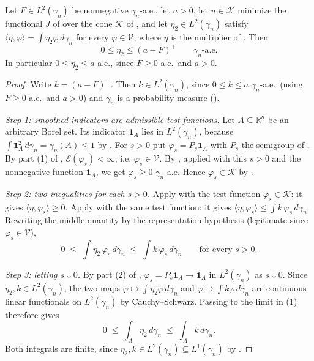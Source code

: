 \begin{lemma}
Let $F \in L^2(\gamma_n)$ be nonnegative $\gamma_n$-a.e., let $a > 0$, let
$u \in \mathcal{K}$ minimize the functional $J$ of 
over the cone $\mathcal{K}$ of , and let
$\eta_2 \in L^2(\gamma_n)$ satisfy
$\langle\eta,\varphi\rangle = \int \eta_2 \varphi\, d\gamma_n$ for every
$\varphi \in \mathcal{V}$, where $\eta$ is the multiplier of
.  Then
\[
  0 \leq \eta_2 \leq (a - F)^+ \qquad \gamma_n\text{-a.e.}
\]
In particular $0 \leq \eta_2 \leq a$ a.e., since $F \geq 0$ a.e.\ and $a > 0$.
\end{lemma}
\begin{proof}
Write $k = (a-F)^+$.  Then $k \in L^2(\gamma_n)$, since $0 \leq k \leq a$
$\gamma_n$-a.e.\ (using $F \geq 0$ a.e.\ and $a > 0$) and $\gamma_n$ is a
probability measure ().

\emph{Step 1: smoothed indicators are admissible test functions.}
Let $A \subseteq \mathbb{R}^n$ be an arbitrary Borel set.  Its indicator
$\mathbf{1}_A$ lies in $L^2(\gamma_n)$, because
$\int \mathbf{1}_A^2 \, d\gamma_n = \gamma_n(A) \leq 1$ by
.  For $s > 0$ put $\varphi_s = P_s \mathbf{1}_A$ with $P_s$
the semigroup of .  By part (1) of
, $\mathcal{E}(\varphi_s) < \infty$, i.e.
$\varphi_s \in \mathcal{V}$.  By , applied with this
$s > 0$ and the nonnegative function $\mathbf{1}_A$, we get
$\varphi_s \geq 0$ $\gamma_n$-a.e.  Hence $\varphi_s \in \mathcal{K}$ by
.

\emph{Step 2: two inequalities for each $s > 0$.}
Apply  with the test function
$\varphi_s \in \mathcal{K}$: it gives $\langle\eta,\varphi_s\rangle \geq 0$.
Apply  with the same test function: it gives
$\langle\eta,\varphi_s\rangle \leq \int k\,\varphi_s\, d\gamma_n$.  Rewriting the
middle quantity by the representation hypothesis (legitimate since
$\varphi_s \in \mathcal{V}$),
\begin{equation*}
  0 \;\leq\; \int \eta_2\, \varphi_s\, d\gamma_n
    \;\leq\; \int k\, \varphi_s \, d\gamma_n
  \qquad\text{for every } s > 0 . \tag{1}
\end{equation*}

\emph{Step 3: letting $s \downarrow 0$.}
By part (2) of ,
$\varphi_s = P_s\mathbf{1}_A \to \mathbf{1}_A$ in $L^2(\gamma_n)$ as
$s \downarrow 0$.  Since $\eta_2, k \in L^2(\gamma_n)$, the two maps
$\varphi \mapsto \int \eta_2\varphi \, d\gamma_n$ and
$\varphi \mapsto \int k \varphi\, d\gamma_n$ are continuous linear functionals on
$L^2(\gamma_n)$ by Cauchy--Schwarz.  Passing to the limit in (1) therefore gives
\begin{equation*}
  0 \;\leq\; \int_A \eta_2 \, d\gamma_n \;\leq\; \int_A k \, d\gamma_n . \tag{2}
\end{equation*}
Both integrals are finite, since $\eta_2, k \in L^2(\gamma_n) \subseteq L^1(\gamma_n)$
by .


\end{proof}
